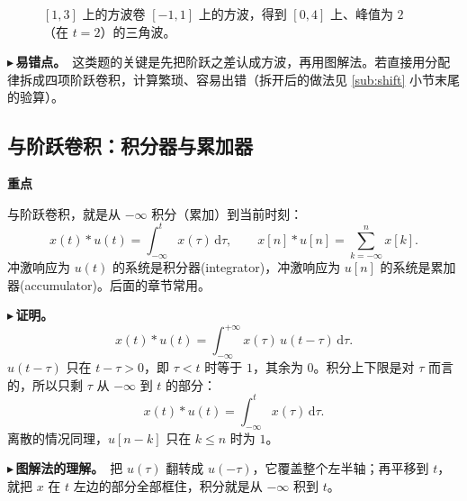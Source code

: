 \documentclass[UTF8,a4paper,11pt]{ctexart}
\newenvironment{remember}{\begin{rememberbox}\textbf{重点}\par\smallskip}{\end{rememberbox}}
\newcommand{\taxes}[5][t]{%
  \draw[->] (#2,0) -- (#3,0) node[right,font=\scriptsize] {$#1$};
  \draw[->] (0,#5) -- (0,#4);
  \node[anchor=north east,font=\tiny,gray!60!black,inner sep=1pt] at (0,-0.02) {$0$};}
\newcommand{\xt}[2]{\draw (#1,0) -- (#1,-0.1) node[anchor=north,font=\tiny,gray!60!black,fill=white,inner sep=0.6pt] {$#2$};}
\newcommand{\yt}[2]{\draw (0,#1) -- (-0.1,#1) node[anchor=east,font=\tiny,gray!60!black,fill=white,inner sep=0.6pt] {$#2$};}
\newcommand{\opsym}[3]{\node[font=\Large] at (#1,#2) {#3};}
\newcounter{ex}[section]
\newcommand{\point}[1]{\par\addvspace{1ex}\noindent\textcolor{ptteal}{$\blacktriangleright$\,\textbf{#1}}\ }
\begin{document}
\begin{figure}[H]
\centering
{}
\caption{$[1,3]$ 上的方波卷 $[-1,1]$ 上的方波，得到 $[0,4]$ 上、峰值为 $2$（在 $t=2$）的三角波。}
\end{figure}

\point{易错点。}这类题的关键是先把阶跃之差认成方波，再用图解法。若直接用分配律拆成四项阶跃卷积，计算繁琐、容易出错（拆开后的做法见 \ref{sub:shift} 小节末尾的验算）。

\subsection{与阶跃卷积：积分器与累加器}\label{sub:step}
\begin{remember}
与阶跃卷积，就是从 $-\infty$ 积分（累加）到当前时刻：
\[
x(t)\ast u(t)=\int_{-\infty}^{t}x(\tau)\,\mathrm{d}\tau,\qquad
x[n]\ast u[n]=\sum_{k=-\infty}^{n}x[k].
\]
冲激响应为 $u(t)$ 的系统是积分器(integrator)，冲激响应为 $u[n]$ 的系统是累加器(accumulator)。后面的章节常用。
\end{remember}

\point{证明。}
\[
x(t)\ast u(t)=\int_{-\infty}^{+\infty}x(\tau)\,u(t-\tau)\,\mathrm{d}\tau .
\]
$u(t-\tau)$ 只在 $t-\tau>0$，即 $\tau<t$ 时等于 $1$，其余为 $0$。积分上下限是对 $\tau$ 而言的，所以只剩 $\tau$ 从 $-\infty$ 到 $t$ 的部分：
\[
x(t)\ast u(t)=\int_{-\infty}^{t}x(\tau)\,\mathrm{d}\tau .
\]
离散的情况同理，$u[n-k]$ 只在 $k\le n$ 时为 $1$。

\point{图解法的理解。}把 $u(\tau)$ 翻转成 $u(-\tau)$，它覆盖整个左半轴；再平移到 $t$，就把 $x$ 在 $t$ 左边的部分全部框住，积分就是从 $-\infty$ 积到 $t$。
\end{document}
